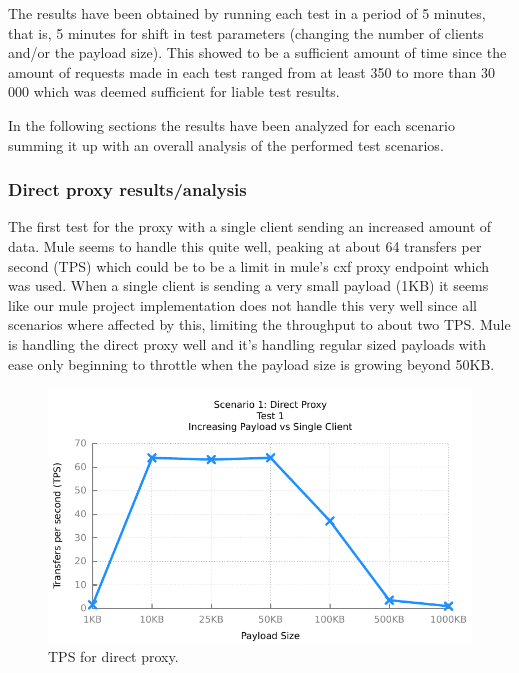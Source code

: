 The results have been obtained by running each test in a period of 5 minutes, that is, 5 minutes for shift in test parameters (changing the number of clients and/or the payload size). 
This showed to be a sufficient amount of time since the amount of requests made in each test ranged from at least 350 to more than 30 000 which was deemed sufficient for liable test results. 

In the following sections the results have been analyzed for each scenario summing it up with an overall analysis of the performed test scenarios.

\subsubsection{Direct proxy results/analysis}

The first test for the proxy with a single client sending an increased amount of data. Mule seems to handle this quite well, peaking at about 64 transfers per second (TPS) which could be to be a limit in mule's cxf proxy endpoint which was used. When a single client is sending a very small payload (1KB) it seems like our mule project implementation does not handle this very well since all scenarios where affected by this, limiting the throughput to about two TPS. Mule is handling the direct proxy well and it's handling regular sized payloads with ease only beginning to throttle when the payload size is growing beyond 50KB.

\begin{figure}[H]
	\caption{TPS for direct proxy.}
	\centerline{\includegraphics{img/proxy_fu_ip_tps}}
	\label{fig:proxy-1-1}
\end{figure}


